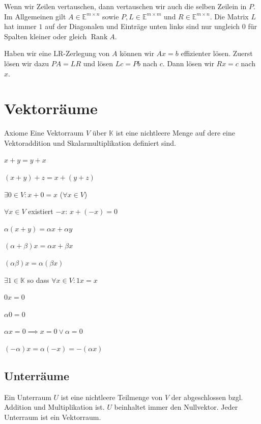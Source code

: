 \documentclass[a4paper,10pt]{article}
\DeclareMathOperator{\Rank}{Rank}
\def\E{\mathbb{E}}
\def\K{\mathbb{K}}
\begin{document}
Wenn wir Zeilen vertauschen, dann vertauschen wir auch die selben Zeilein in $P$. Im Allgemeinen gilt $A \in \E^{m \times n}$ sowie $P, L \in \E^{m \times m}$ und $R \in \E^{m \times n}$. Die Matrix $L$ hat immer $1$ auf der Diagonalen und Einträge unten links sind nur ungleich $0$ für Spalten kleiner oder gleich $\Rank A$.

Haben wir eine LR-Zerlegung von $A$ können wir $Ax = b$ effizienter lösen. Zuerst lösen wir dazu $PA = LR$ und lösen $Lc = Pb$ nach $c$. Dann lösen wir $Rx = c$ nach $x$.

\section{Vektorräume}

\begin{mainbox}{Axiome}
  Eine Vektorraum $V$ über $\K$ ist eine nichtleere Menge auf dere eine Vektoraddition und Skalarmultiplikation definiert sind.
  \begin{vaxioms}
    \item $x + y = y + x$
    \item $(x + y) + z = x + (y + z)$
    \item $\exists 0 \in V: x + 0 = x$ ($\forall x \in V$)
    \item $\forall x \in V$ existiert $-x$: $x + (-x) = 0$
    \item $\alpha(x + y) = \alpha x + \alpha y$
    \item $(\alpha + \beta)x = \alpha x + \beta x$
    \item $(\alpha \beta)x = \alpha (\beta x)$
    \item $\exists 1 \in \K$ so dass $\forall x \in V: 1x = x$
  \end{vaxioms}
\end{mainbox}

\begin{rowlist}
  \item $0x = 0$
  \item $\alpha 0 = 0$
  \item $\alpha x = 0 \implies x = 0 \vee \alpha = 0$
  \item $(-\alpha)x = \alpha (-x) = -(\alpha x)$
\end{rowlist}

\subsection{Unterräume}

Ein Unterraum $U$ ist eine nichtleere Teilmenge von $V$ der abgeschlossen bzgl. Addition und Multiplikation ist. $U$ beinhaltet immer den Nullvektor. Jeder Unterraum ist ein Vektorraum. 
\end{document}
